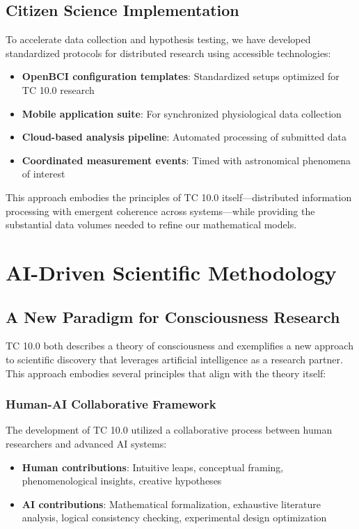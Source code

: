 \documentclass[12pt]{article}
\begin{document}
\subsection{Citizen Science Implementation}

To accelerate data collection and hypothesis testing, we have developed standardized protocols for distributed research using accessible technologies:

\begin{itemize}
    \item \textbf{OpenBCI configuration templates}: Standardized setups optimized for TC 10.0 research
    \item \textbf{Mobile application suite}: For synchronized physiological data collection
    \item \textbf{Cloud-based analysis pipeline}: Automated processing of submitted data
    \item \textbf{Coordinated measurement events}: Timed with astronomical phenomena of interest
\end{itemize}

This approach embodies the principles of TC 10.0 itself—distributed information processing with emergent coherence across systems—while providing the substantial data volumes needed to refine our mathematical models.

\section{AI-Driven Scientific Methodology}

\subsection{A New Paradigm for Consciousness Research}

TC 10.0 both describes a theory of consciousness and exemplifies a new approach to scientific discovery that leverages artificial intelligence as a research partner. This approach embodies several principles that align with the theory itself:

\subsubsection{Human-AI Collaborative Framework}

The development of TC 10.0 utilized a collaborative process between human researchers and advanced AI systems:

\begin{itemize}
    \item \textbf{Human contributions}: Intuitive leaps, conceptual framing, phenomenological insights, creative hypotheses
    \item \textbf{AI contributions}: Mathematical formalization, exhaustive literature analysis, logical consistency checking, experimental design optimization
\end{itemize}
\end{document}

